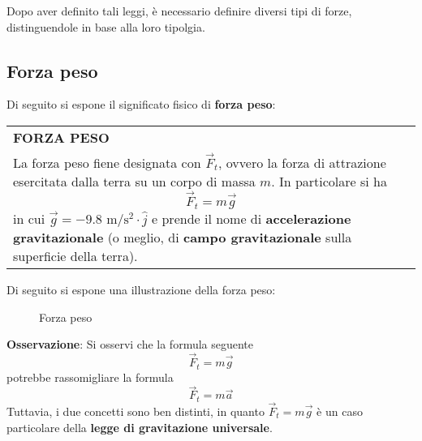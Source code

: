 \documentclass[a4paper]{extarticle}
\renewcommand\arraystretch{}
\begin{document}
\vspace{1em}
\noindent
Dopo aver definito tali leggi, è necessario definire diversi tipi di forze, distinguendole in base alla loro tipolgia.

\vspace{1em}
\noindent
\subsection{Forza peso}
Di seguito si espone il significato fisico di \textbf{forza peso}:

\vspace{1em}
\setlength{\tabcolsep}{14pt}
\renewcommand{\arraystretch}{2}
\noindent
\begin{tabularx}{\textwidth}{@{}|P|@{}}
    \hline
    {\textbf{FORZA PESO}}\\
    \parbox{\linewidth}{La forza peso fiene designata con $\vec{F}_t$, ovvero la forza di attrazione esercitata dalla terra su un corpo di massa $m$. In particolare si ha
    \[\boxed{\vec{F}_t = m \vec{g}}\]
    in cui $\vec{g} = -9.8 \text{ m}/\text{s}^2 \cdot \hat{j}$ e prende il nome di \textbf{accelerazione gravitazionale} (o meglio, di \textbf{campo gravitazionale} sulla superficie della terra).
    \vspace{3mm}}\\
    \hline
\end{tabularx}

\vspace{1em}
Di seguito si espone una illustrazione della forza peso:

\vspace{1em}
\begin{figure}[H]
  \centering
  \caption{Forza peso}
  \label{fig:forza_peso}
\end{figure}

\vspace{1em}
\noindent
\textbf{Osservazione}: Si osservi che la formula seguente
\[\vec{F}_t = m \vec{g}\]
potrebbe rassomigliare la formula
\[\vec{F}_t = m \vec{a}\]
Tuttavia, i due concetti sono ben distinti, in quanto $\vec{F}_t = m \vec{g}$ è un caso particolare della \textbf{legge di gravitazione universale}.
\end{document}
